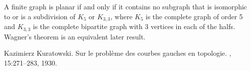 \documentclass[12pt]{article}
\begin{document}
A finite graph is planar if and only if it contains no subgraph that is isomorphic to or is a subdivision of $K_5$ or $K_{3,3}$, where $K_5$ is the complete graph of order 5 and $K_{3,3}$ is the complete bipartite graph with 3 vertices in each of the halfs. Wagner's theorem is an equivalent later result.

\begin{thebibliography}{1}

Kazimierz Kuratowski.
\newblock Sur le probl{\`e}me des courbes gauches en topologie.
, 15:271--283, 1930.

\end{thebibliography}

\end{document}
